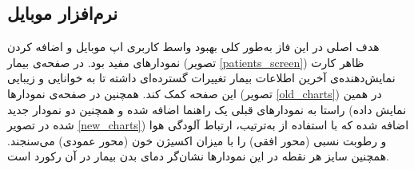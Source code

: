 \documentclass[12pt]{article}
\begin{document}
\subsection{نرم‌افزار موبایل}
هدف اصلی در این فاز به‌طور کلی بهبود واسط کاربری اپ موبایل و اضافه کردن نمودارهای مفید بود. در صفحه‌ی بیمار (تصویر
\ref{patients_screen})
ظاهر کارت نمایش‌دهنده‌ی آخرین اطلاعات بیمار تغییرات گسترده‌ای داشته تا به خوانایی و زیبایی این صفحه کمک کند. همچنین در صفحه‌ی نمودارها (تصویر 
\ref{old_charts})
در همین راستا به نمودارهای قبلی یک راهنما اضافه شده و همچنین دو نمودار جدید (نمایش داده شده در تصویر
\ref{new_charts})
اضافه شده که با استفاده از 
به‌ترتیب، ارتباط آلودگی هوا و رطوبت نسبی (محور افقی) را با میزان اکسیژن خون (محور عمودی) می‌سنجند. همچنین سایز هر نقطه در این نمودارها نشان‌گر دمای  بدن بیمار در آن رکورد است.
\end{document}
